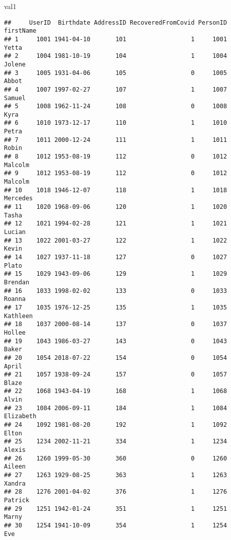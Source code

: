 \documentclass[
]{article}
\newenvironment{Shaded}{\begin{snugshade}}{\end{snugshade}}
\newcommand{\NormalTok}[1]{#1}
\begin{document}
\begin{Shaded}
\begin{Highlighting}[]
\NormalTok{val1}
\end{Highlighting}
\end{Shaded}

\begin{verbatim}
##     UserID  Birthdate AddressID RecoveredFromCovid PersonID  firstName
## 1     1001 1941-04-10       101                  1     1001      Yetta
## 2     1004 1981-10-19       104                  1     1004     Jolene
## 3     1005 1931-04-06       105                  0     1005      Abbot
## 4     1007 1997-02-27       107                  1     1007     Samuel
## 5     1008 1962-11-24       108                  0     1008       Kyra
## 6     1010 1973-12-17       110                  1     1010      Petra
## 7     1011 2000-12-24       111                  1     1011      Robin
## 8     1012 1953-08-19       112                  0     1012    Malcolm
## 9     1012 1953-08-19       112                  0     1012    Malcolm
## 10    1018 1946-12-07       118                  1     1018   Mercedes
## 11    1020 1968-09-06       120                  1     1020      Tasha
## 12    1021 1994-02-28       121                  1     1021     Lucian
## 13    1022 2001-03-27       122                  1     1022      Kevin
## 14    1027 1937-11-18       127                  0     1027      Plato
## 15    1029 1943-09-06       129                  1     1029    Brendan
## 16    1033 1998-02-02       133                  0     1033     Roanna
## 17    1035 1976-12-25       135                  1     1035   Kathleen
## 18    1037 2000-08-14       137                  0     1037     Hollee
## 19    1043 1986-03-27       143                  0     1043      Baker
## 20    1054 2018-07-22       154                  0     1054      April
## 21    1057 1938-09-24       157                  0     1057      Blaze
## 22    1068 1943-04-19       168                  1     1068      Alvin
## 23    1084 2006-09-11       184                  1     1084  Elizabeth
## 24    1092 1981-08-20       192                  1     1092      Elton
## 25    1234 2002-11-21       334                  1     1234     Alexis
## 26    1260 1999-05-30       360                  0     1260     Aileen
## 27    1263 1929-08-25       363                  1     1263     Xandra
## 28    1276 2001-04-02       376                  1     1276    Patrick
## 29    1251 1942-01-24       351                  1     1251      Marny
## 30    1254 1941-10-09       354                  1     1254        Eve

\end{verbatim}
\end{document}
